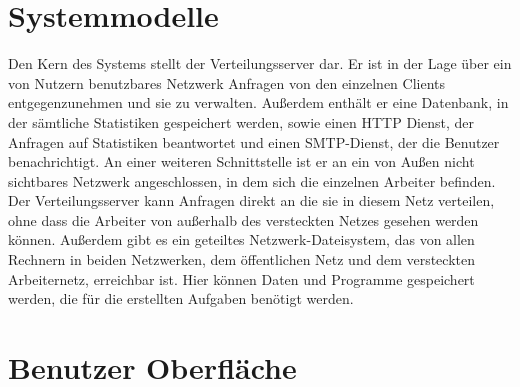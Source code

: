 \documentclass[a4paper,12pt]{article}
\begin{document}










\section{Systemmodelle}


Den Kern des Systems stellt der Verteilungsserver dar. Er ist in der Lage über ein von Nutzern benutzbares Netzwerk Anfragen von den einzelnen Clients entgegenzunehmen und sie zu verwalten.
Außerdem enthält er eine Datenbank, in der sämtliche Statistiken gespeichert werden, sowie einen HTTP Dienst, der Anfragen auf Statistiken beantwortet und einen SMTP-Dienst, der die Benutzer benachrichtigt. An einer weiteren Schnittstelle ist er an ein von Außen nicht sichtbares Netzwerk angeschlossen, in dem sich die einzelnen Arbeiter befinden. Der Verteilungsserver kann Anfragen direkt an die sie in diesem Netz verteilen, ohne dass die Arbeiter von außerhalb des versteckten Netzes gesehen werden können. Außerdem gibt es ein geteiltes Netzwerk-Dateisystem, das von allen Rechnern in beiden Netzwerken, dem öffentlichen Netz und dem versteckten Arbeiternetz, erreichbar ist. Hier können Daten und Programme gespeichert werden, die für die erstellten Aufgaben benötigt werden.


\clearpage
\section{Benutzer Oberfläche}
\end{document}
